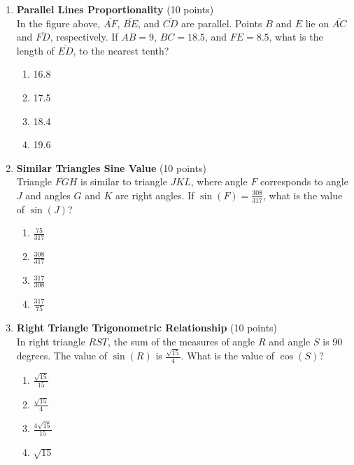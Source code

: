 \begin{enumerate}
  \item \textbf{Parallel Lines Proportionality} (10 points)\\
  In the figure above, $\overline{AF}$, $\overline{BE}$, and $\overline{CD}$ are parallel. Points $B$ and $E$ lie on $\overline{AC}$ and $\overline{FD}$, respectively. If $AB=9$, $BC=18.5$, and $FE=8.5$, what is the length of $\overline{ED}$, to the nearest tenth?
  \begin{enumerate}[label=(\Alph*)]
    \item 16.8
    \item 17.5
    \item 18.4
    \item 19.6
  \end{enumerate}
  \begin{subanswer}
  \end{subanswer}

  \newpage

  \item \textbf{Similar Triangles Sine Value} (10 points)\\
  Triangle $FGH$ is similar to triangle $JKL$, where angle $F$ corresponds to angle $J$ and angles $G$ and $K$ are right angles. If $\sin(F)=\frac{308}{317}$, what is the value of $\sin(J)$?
  \begin{enumerate}[label=(\Alph*)]
    \item $\frac{75}{317}$
    \item $\frac{308}{317}$
    \item $\frac{317}{308}$
    \item $\frac{317}{75}$
  \end{enumerate}
  \begin{subanswer}
  \end{subanswer}

  \item \textbf{Right Triangle Trigonometric Relationship} (10 points)\\
  In right triangle $RST$, the sum of the measures of angle $R$ and angle $S$ is 90 degrees. The value of $\sin(R)$ is $\frac{\sqrt{15}}{4}$. What is the value of $\cos(S)$?
  \begin{enumerate}[label=(\Alph*)]
    \item $\frac{\sqrt{15}}{15}$
    \item $\frac{\sqrt{15}}{4}$
    \item $\frac{4\sqrt{15}}{15}$
    \item $\sqrt{15}$
  \end{enumerate}
  \begin{subanswer}
  \end{subanswer}


\end{enumerate}
